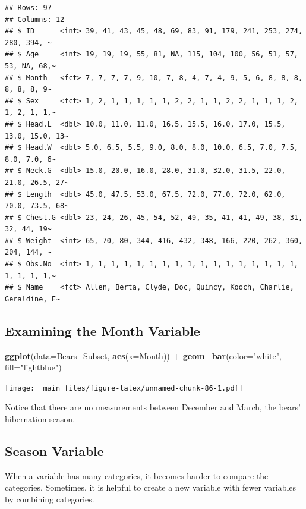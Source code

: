 \documentclass[]{book}
\newenvironment{Shaded}{\begin{snugshade}}{\end{snugshade}}
\newcommand{\KeywordTok}[1]{\textcolor[rgb]{0.13,0.29,0.53}{\textbf{#1}}}
\newcommand{\DataTypeTok}[1]{\textcolor[rgb]{0.13,0.29,0.53}{#1}}
\newcommand{\StringTok}[1]{\textcolor[rgb]{0.31,0.60,0.02}{#1}}
\newcommand{\OperatorTok}[1]{\textcolor[rgb]{0.81,0.36,0.00}{\textbf{#1}}}
\newcommand{\NormalTok}[1]{#1}
\begin{document}
\begin{verbatim}
## Rows: 97
## Columns: 12
## $ ID      <int> 39, 41, 43, 45, 48, 69, 83, 91, 179, 241, 253, 274, 280, 394, ~
## $ Age     <int> 19, 19, 19, 55, 81, NA, 115, 104, 100, 56, 51, 57, 53, NA, 68,~
## $ Month   <fct> 7, 7, 7, 7, 9, 10, 7, 8, 4, 7, 4, 9, 5, 6, 8, 8, 8, 8, 8, 8, 9~
## $ Sex     <fct> 1, 2, 1, 1, 1, 1, 1, 2, 2, 1, 1, 2, 2, 1, 1, 1, 2, 1, 2, 1, 1,~
## $ Head.L  <dbl> 10.0, 11.0, 11.0, 16.5, 15.5, 16.0, 17.0, 15.5, 13.0, 15.0, 13~
## $ Head.W  <dbl> 5.0, 6.5, 5.5, 9.0, 8.0, 8.0, 10.0, 6.5, 7.0, 7.5, 8.0, 7.0, 6~
## $ Neck.G  <dbl> 15.0, 20.0, 16.0, 28.0, 31.0, 32.0, 31.5, 22.0, 21.0, 26.5, 27~
## $ Length  <dbl> 45.0, 47.5, 53.0, 67.5, 72.0, 77.0, 72.0, 62.0, 70.0, 73.5, 68~
## $ Chest.G <dbl> 23, 24, 26, 45, 54, 52, 49, 35, 41, 41, 49, 38, 31, 32, 44, 19~
## $ Weight  <int> 65, 70, 80, 344, 416, 432, 348, 166, 220, 262, 360, 204, 144, ~
## $ Obs.No  <int> 1, 1, 1, 1, 1, 1, 1, 1, 1, 1, 1, 1, 1, 1, 1, 1, 1, 1, 1, 1, 1,~
## $ Name    <fct> Allen, Berta, Clyde, Doc, Quincy, Kooch, Charlie, Geraldine, F~
\end{verbatim}

\subsection{Examining the Month
Variable}\label{examining-the-month-variable}

\begin{Shaded}
\begin{Highlighting}[]
\KeywordTok{ggplot}\NormalTok{(}\DataTypeTok{data=}\NormalTok{Bears_Subset, }\KeywordTok{aes}\NormalTok{(}\DataTypeTok{x=}\NormalTok{Month)) }\OperatorTok{+}\StringTok{ }\KeywordTok{geom_bar}\NormalTok{(}\DataTypeTok{color=}\StringTok{"white"}\NormalTok{, }\DataTypeTok{fill=}\StringTok{"lightblue"}\NormalTok{)}
\end{Highlighting}
\end{Shaded}

\texttt{[image: \_main\_files/figure-latex/unnamed-chunk-86-1.pdf]}

Notice that there are no measurements between December and March, the
bears' hibernation season.

\subsection{Season Variable}\label{season-variable}

When a variable has many categories, it becomes harder to compare the
categories. Sometimes, it is helpful to create a new variable with fewer
variables by combining categories.
\end{document}
